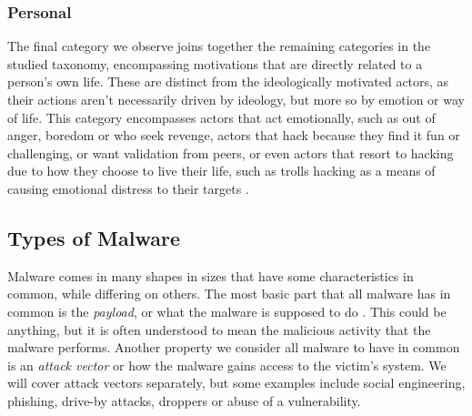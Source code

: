 \subsubsection{Personal}
The final category we observe joins together the remaining categories in the studied taxonomy, encompassing motivations
that are directly related to a person's own life. These are distinct from the ideologically motivated actors, as their
actions aren't necessarily driven by ideology, but more so by emotion or way of life. This category encompasses actors
that act emotionally, such as out of anger, boredom or who seek revenge, actors that hack because they find it fun or
challenging, or want validation from peers, or even actors that resort to hacking due to how they choose to live their
life, such as trolls hacking as a means of causing emotional distress to their targets
\cite{malware-motivation-classification, brewster-malware-motivation}.

\subsection{Types of Malware}
Malware comes in many shapes in sizes that have some characteristics in common, while differing on others. The most
basic part that all malware has in common is the \emph{payload}, or what the malware is supposed to do 
\cite[p.~12]{aycock-book}. This could be anything, but it is often understood to mean the malicious activity that 
the malware performs. Another property we consider all malware to have in common is an \emph{attack vector} or how
the malware gains access to the victim's system. We will cover attack vectors separately, but some examples include
social engineering, phishing, drive-by attacks, droppers or abuse of a vulnerability.

